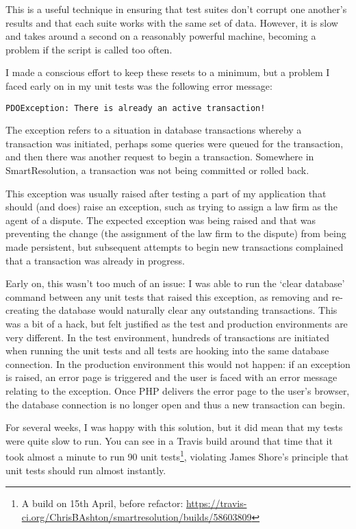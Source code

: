 This is a useful technique in ensuring that test suites don't corrupt one another's results and that each suite works with the same set of data. However, it is slow and takes around a second on a reasonably powerful machine, becoming a problem if the script is called too often.

I made a conscious effort to keep these resets to a minimum, but a problem I faced early on in my unit tests was the following error message:

\begin{lstlisting}
PDOException: There is already an active transaction!
\end{lstlisting}

The exception refers to a situation in database transactions whereby a transaction was initiated, perhaps some queries were queued for the transaction, and then there was another request to begin a transaction. Somewhere in SmartResolution, a transaction was not being committed or rolled back.

This exception was usually raised after testing a part of my application that should (and does) raise an exception, such as trying to assign a law firm as the agent of a dispute. The expected exception was being raised and that was preventing the change (the assignment of the law firm to the dispute) from being made persistent, but subsequent attempts to begin new transactions complained that a transaction was already in progress.

Early on, this wasn't too much of an issue: I was able to run the `clear database' command between any unit tests that raised this exception, as removing and re-creating the database would naturally clear any outstanding transactions. This was a bit of a hack, but felt justified as the test and production environments are very different. In the test environment, hundreds of transactions are initiated when running the unit tests and all tests are hooking into the same database connection. In the production environment this would not happen: if an exception is raised, an error page is triggered and the user is faced with an error message relating to the exception. Once PHP delivers the error page to the user's browser, the database connection is no longer open and thus a new transaction can begin.

For several weeks, I was happy with this solution, but it did mean that my tests were quite slow to run. You can see in a Travis build around that time that it took almost a minute to run 90 unit tests\footnote{A build on 15th April, before refactor: \url{https://travis-ci.org/ChrisBAshton/smartresolution/builds/58603809}}, violating James Shore's principle that unit tests should run almost instantly.

